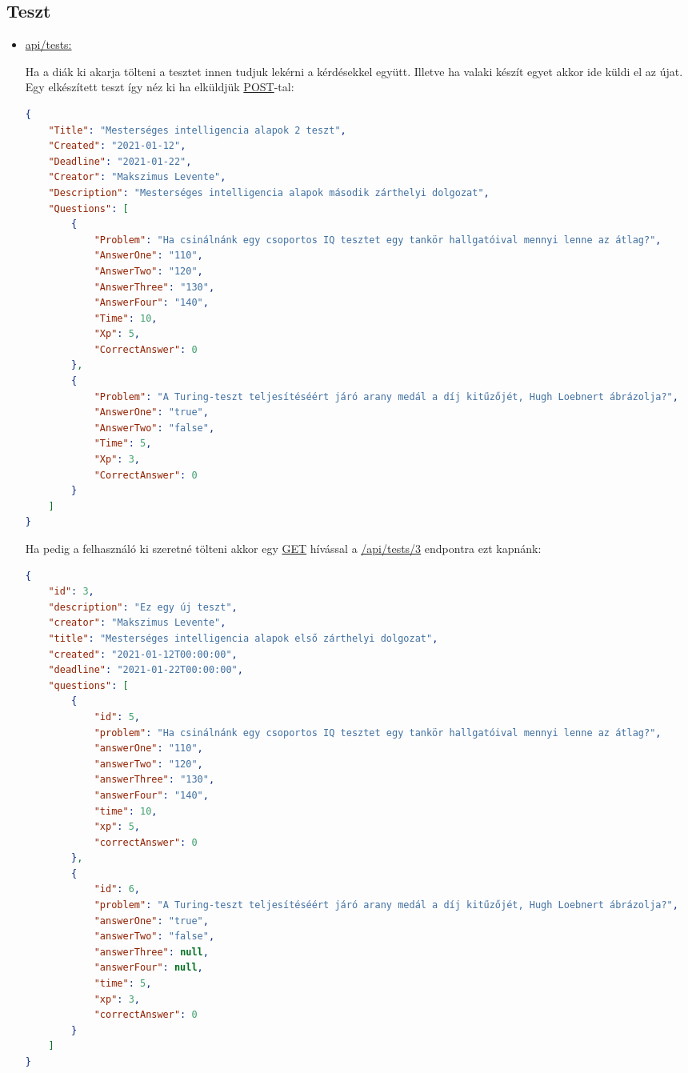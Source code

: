 \subsection{Teszt}
\begin{itemize}[label={$\bullet$}, topsep=0pt, itemsep=0pt, leftmargin=15pt]
    \item[] {\url{api/tests:}}
          \begin{addmargin}[\parindent]{0pt}
              Ha a diák ki akarja tölteni a tesztet innen tudjuk lekérni a kérdésekkel együtt. Illetve ha valaki készít egyet akkor ide küldi el az újat.
              Egy elkészített teszt így néz ki ha elküldjük \url{POST}-tal:
              \begin{lstlisting}[language=json,firstnumber=1]
{
    "Title": "Mesterséges intelligencia alapok 2 teszt",
    "Created": "2021-01-12",
    "Deadline": "2021-01-22",
    "Creator": "Makszimus Levente",
    "Description": "Mesterséges intelligencia alapok második zárthelyi dolgozat",
    "Questions": [
        {
            "Problem": "Ha csinálnánk egy csoportos IQ tesztet egy tankör hallgatóival mennyi lenne az átlag?",
            "AnswerOne": "110",
            "AnswerTwo": "120",
            "AnswerThree": "130",
            "AnswerFour": "140",
            "Time": 10,
            "Xp": 5,
            "CorrectAnswer": 0
        },
        {
            "Problem": "A Turing-teszt teljesítéséért járó arany medál a díj kitűzőjét, Hugh Loebnert ábrázolja?",
            "AnswerOne": "true",
            "AnswerTwo": "false",
            "Time": 5,
            "Xp": 3,
            "CorrectAnswer": 0
        }
    ]
}
                \end{lstlisting}

              Ha pedig a felhasználó ki szeretné tölteni akkor egy \url{GET} hívással a \url{/api/tests/3} endpontra ezt kapnánk:
              \begin{lstlisting}[language=json,firstnumber=1]
{
    "id": 3,
    "description": "Ez egy új teszt",
    "creator": "Makszimus Levente",
    "title": "Mesterséges intelligencia alapok első zárthelyi dolgozat",
    "created": "2021-01-12T00:00:00",
    "deadline": "2021-01-22T00:00:00",
    "questions": [
        {
            "id": 5,
            "problem": "Ha csinálnánk egy csoportos IQ tesztet egy tankör hallgatóival mennyi lenne az átlag?",
            "answerOne": "110",
            "answerTwo": "120",
            "answerThree": "130",
            "answerFour": "140",
            "time": 10,
            "xp": 5,
            "correctAnswer": 0
        },
        {
            "id": 6,
            "problem": "A Turing-teszt teljesítéséért járó arany medál a díj kitűzőjét, Hugh Loebnert ábrázolja?",
            "answerOne": "true",
            "answerTwo": "false",
            "answerThree": null,
            "answerFour": null,
            "time": 5,
            "xp": 3,
            "correctAnswer": 0
        }
    ]
}
                    \end{lstlisting}
          \end{addmargin}
\end{itemize}



